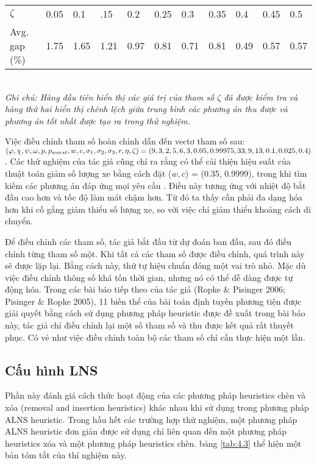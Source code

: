 
\begin{table}[caption={Tham số $\zeta$ và chất lượng phương án}, label=tab:4.2]
    \begin{tabular}{@{}lllllllllll@{}}
        \hline
        $\zeta$ & 0.05 & 0.1  & .15  & 0.2  & 0.25 & 0.3  & 0.35 & 0.4  & 0.45 & 0.5     \\
        Avg. gap (\%) & 1.75 & 1.65 & 1.21 & 0.97 & 0.81 & 0.71 & 0.81 & 0.49 & 0.57 & 0.57     \\ \bottomrule
        \end{tabular} \\
        \justify
        \textit{Ghi chú: Hàng đầu tiên hiển thị các giá trị của tham số $\zeta$ đã được kiểm tra và hàng thứ hai hiển thị chênh lệch giữa trung bình các phương án thu được và phương án tốt nhất được tạo ra trong thử nghiệm.}
    \label{tab:b1}
\end{table}


Việc điều chỉnh tham số hoàn chỉnh dẫn đến vectơ tham số sau:
$(\varphi, \chi, \psi, \omega, p,  p_{worst}, \\ w, c, \sigma_1, \sigma_2, \sigma_3, r, \eta, \zeta) = (9, 3, 2, 5, 6, 3, 0.05, 0.99975, 33, 9, 13, 0.1, 0.025, 0.4)$. Các thử nghiệm của tác giả cũng chỉ ra rằng có thể cải thiện hiệu suất của thuật toán giảm số lượng xe bằng cách đặt ($w,c$)  = (0.35, 0.9999), trong khi tìm kiếm các phương án đáp ứng mọi yêu cầu . Điều này tương ứng với nhiệt độ bắt đầu cao hơn và tốc độ làm mát chậm hơn. Từ đó ta thấy cần phải đa dạng hóa hơn khi cố gắng giảm thiểu số lượng xe, so với việc chỉ giảm thiểu khoảng cách di chuyển.

Để điều chỉnh các tham số, tác giả bắt đầu từ dự đoán ban đầu, sau đó điều chỉnh từng tham số một. Khi tất cả các tham số được điều chỉnh, quá trình này sẽ được lặp lại. Bằng cách này, thứ tự hiệu chuẩn đóng một vai trò nhỏ. Mặc dù việc điều chỉnh thông số khá tốn thời gian, nhưng nó có thể dễ dàng được tự động hóa. Trong các bài báo tiếp theo của tác giả (Ropke \& Pisinger 2006; Pisinger \& Ropke 2005), 11 biến thể của bài toán định tuyến phương tiện được giải quyết bằng cách sử dụng phương pháp heuristic được đề xuất trong bài báo này, tác giả chỉ điều chỉnh lại một số tham số và thu được kết quả rất thuyết phục. Có vẻ như việc điều chỉnh toàn bộ các tham số chỉ cần thực hiện một lần.

\subsection{Cấu hình LNS}
Phần này đánh giá cách thức hoạt động của các phương pháp heuristics chèn và xóa (removal and insertion heuristics) khác nhau khi sử dụng trong phương pháp ALNS heuristic. Trong hầu hết các trường hợp thử nghiệm, một phương pháp ALNS heuristic đơn giản được sử dụng chỉ liên quan đến một phương pháp heuristics xóa và một phương pháp heuristics chèn. bảng \ref{tab:4.3} thể hiện một bản tóm tắt của thí nghiệm này.

